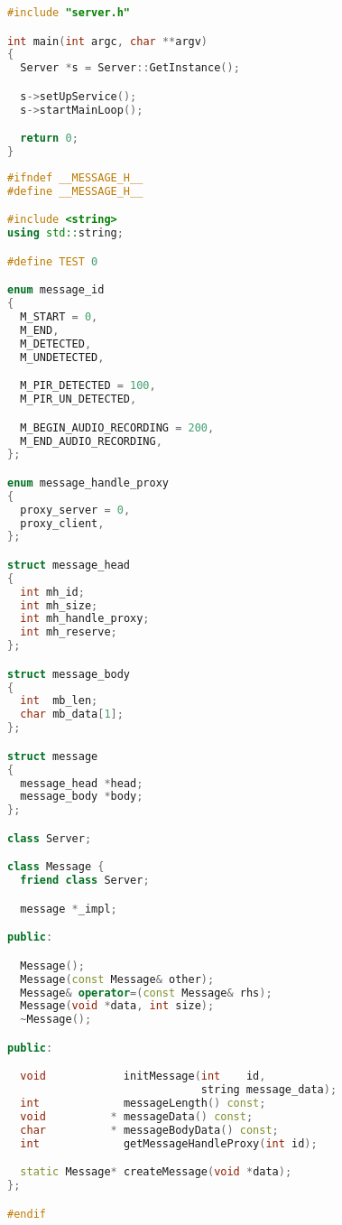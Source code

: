 \begin{lstlisting}[caption=main-server.cpp,language=C++]
#include "server.h"

int main(int argc, char **argv)
{
  Server *s = Server::GetInstance();

  s->setUpService();
  s->startMainLoop();

  return 0;
}
\end{lstlisting}





\begin{lstlisting}[caption=message.h,language=C++]
#ifndef __MESSAGE_H__
#define __MESSAGE_H__

#include <string>
using std::string;

#define TEST 0

enum message_id
{
  M_START = 0,
  M_END,
  M_DETECTED,
  M_UNDETECTED,

  M_PIR_DETECTED = 100,
  M_PIR_UN_DETECTED,

  M_BEGIN_AUDIO_RECORDING = 200,
  M_END_AUDIO_RECORDING,
};

enum message_handle_proxy
{
  proxy_server = 0,
  proxy_client,
};

struct message_head
{
  int mh_id;
  int mh_size;
  int mh_handle_proxy;
  int mh_reserve;
};

struct message_body
{
  int  mb_len;
  char mb_data[1];
};

struct message
{
  message_head *head;
  message_body *body;
};

class Server;

class Message {
  friend class Server;

  message *_impl;

public:

  Message();
  Message(const Message& other);
  Message& operator=(const Message& rhs);
  Message(void *data, int size);
  ~Message();

public:

  void            initMessage(int    id,
                              string message_data);
  int             messageLength() const;
  void          * messageData() const;
  char          * messageBodyData() const;
  int             getMessageHandleProxy(int id);

  static Message* createMessage(void *data);
};

#endif

\end{lstlisting}





